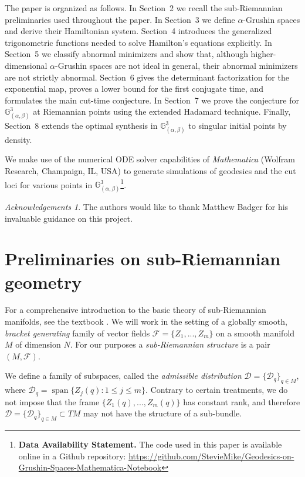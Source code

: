 \documentclass[12pt]{amsart}
\numberwithin{equation}{section}
\theoremstyle{plain}
\theoremstyle{definition}
\theoremstyle{remark}
\newtheorem*{ack*}{Acknowledgements}
\begin{document}
The paper is organized as follows. In Section~2 we recall the sub-Riemannian
preliminaries used throughout the paper. In Section~3 we define $\alpha$-Grushin spaces and derive their Hamiltonian system. Section~4 introduces the generalized
trigonometric functions needed to solve Hamilton's equations explicitly. In
Section~5 we classify abnormal minimizers and show that, although higher-dimensional $\alpha$-Grushin spaces are not ideal in general, their abnormal minimizers are not
strictly abnormal. Section~6 gives the determinant factorization for the exponential
map, proves a lower bound for the first conjugate time, and formulates the main cut-time
conjecture. In Section~7 we prove the conjecture for \(\mathbb G^3_{(\alpha,\beta)}\)
at Riemannian points using the extended Hadamard technique. Finally, Section~8 extends
the optimal synthesis in $\mathbb{G}^3_{(\alpha,\beta)}$ to singular initial points by density.

We make use of the numerical ODE solver capabilities of \emph{Mathematica} (Wolfram Research, Champaign, IL, USA) to generate simulations of geodesics and the cut loci for various points in $\mathbb{G}^3_{(\alpha,\beta)}$\footnote{\textbf{Data Availability Statement.}
    The code used in this paper is available online in a Github repository: \url{https://github.com/StevieMike/Geodesics-on-Grushin-Spaces-Mathematica-Notebook}}.

\begin{ack*} The authors would like to thank Matthew Badger for his invaluable guidance on this project.
\end{ack*}


\section{Preliminaries on sub-Riemannian geometry}\label{s.subRiemBasics}


For a comprehensive introduction to the basic theory of sub-Riemannian manifolds, see the textbook \cite{AgrachevBarilariBoscainBook2020}. We will work in the setting of a globally smooth, \emph{bracket generating} family of vector fields $\mathcal{F}=\{Z_1,...,Z_m\}$ on a smooth manifold $M$ of dimension $N$. For our purposes a \emph{sub-Riemannian structure} is a pair $(M,\mathcal{F})$.

We define a family of subspaces, called the \emph{admissible distribution} \( \mathcal{D} = \{\mathcal{D}_q\}_{q\in M} \), where $\mathcal{D}_q=\operatorname{span}\{Z_j(q):1\leq j\leq m\}$. Contrary to certain treatments, we do not impose that the frame $\{Z_1(q),...,Z_m(q)\}$ has constant rank, and therefore $\mathcal{D}=\{\mathcal{D}_q\}_{q\in M}\subset TM$ may not have the structure of a sub-bundle.
\end{document}
